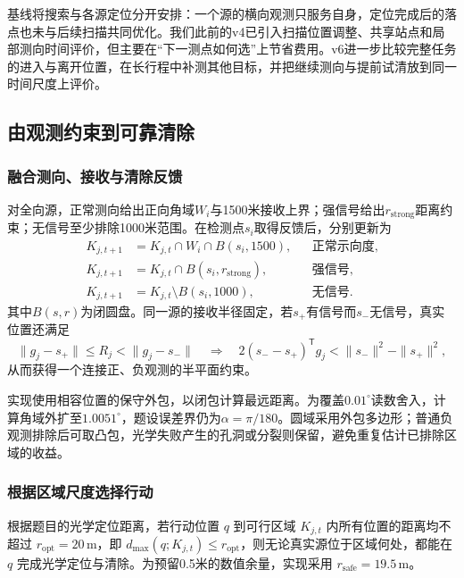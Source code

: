 基线将搜索与各源定位分开安排：一个源的横向观测只服务自身，定位完成后的落点也未与后续扫描共同优化。我们此前的v4已引入扫描位置调整、共享站点和局部测向时间评价，但主要在“下一测点如何选”上节省费用。v6进一步比较完整任务的进入与离开位置，在长行程中补测其他目标，并把继续测向与提前试清放到同一时间尺度上评价。

\subsection{由观测约束到可靠清除}

\subsubsection{融合测向、接收与清除反馈}

对全向源，正常测向给出正向角域$W_i$与1500米接收上界；强信号给出$r_{\mathrm{strong}}$距离约束；无信号至少排除1000米范围。在检测点$s_i$取得反馈后，分别更新为
\begin{equation}
\begin{aligned}
 K_{j,t+1}&=K_{j,t}\cap W_i\cap B(s_i,1500), &&\text{正常示向度},\\
 K_{j,t+1}&=K_{j,t}\cap B(s_i,r_{\mathrm{strong}}), &&\text{强信号},\\
 K_{j,t+1}&=K_{j,t}\setminus B(s_i,1000), &&\text{无信号}.
\end{aligned}
\label{eq:q3-update}
\end{equation}
其中$B(s,r)$为闭圆盘。同一源的接收半径固定，若$s_+$有信号而$s_-$无信号，真实位置还满足
\begin{equation}
\|g_j-s_+\|\le R_j<\|g_j-s_-\|
\quad\Longrightarrow\quad
2(s_--s_+)^{\mathsf T}g_j<\|s_-\|^2-\|s_+\|^2,
\label{eq:q3-coupling}
\end{equation}
从而获得一个连接正、负观测的半平面约束。

实现使用相容位置的保守外包，以闭包计算最远距离。为覆盖$0.01^\circ$读数舍入，计算角域外扩至$1.0051^\circ$，题设误差界仍为$\alpha=\pi/180$。圆域采用外包多边形；普通负观测排除后可取凸包，光学失败产生的孔洞或分裂则保留，避免重复估计已排除区域的收益。

\subsubsection{根据区域尺度选择行动}

根据题目的光学定位距离，若行动位置 \(q\) 到可行区域 \(K_{j,t}\) 内所有位置的距离均不超过 \(r_{\mathrm{opt}}=20\,\mathrm{m}\)，即 \(d_{\max}(q;K_{j,t})\le r_{\mathrm{opt}}\)，则无论真实源位于区域何处，都能在 \(q\) 完成光学定位与清除。为预留0.5米的数值余量，实现采用 \(r_{\mathrm{safe}}=19.5\,\mathrm{m}\)。

